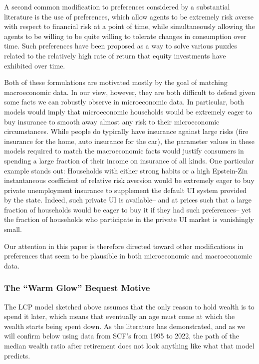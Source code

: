 \documentclass{article}
\begin{document}
A second common modification to preferences considered by a substantial literature is the use of \cite{Epstein_1991} preferences, which allow agents to be extremely risk averse with respect to financial risk at a point of time, while simultaneously allowing the agents to be willing to be quite willing to tolerate changes in consumption over time.
Such preferences have been proposed as a way to solve various puzzles related to the relatively high rate of return that equity investments have exhibited over time.

Both of these formulations are motivated mostly by the goal of matching macroeconomic data.
In our view, however, they are both difficult to defend given some facts we can robustly observe in microeconomic data.
In particular, both models would imply that microeconomic households would be extremely eager to buy insurance to smooth away almost any risk to their microeconomic circumstances.
While people do typically have insurance against large risks (fire insurance for the home, auto insurance for the car), the parameter values in these models required to match the macroeconomic facts would justify consumers in spending a large fraction of their income on insurance of all kinds.
One particular example stands out: Households with either strong habits or a high Epstein-Zin instantaneous coefficient of relative risk aversion would be extremely eager to buy private unemployment insurance to supplement the default UI system provided by the state.
Indeed, such private UI is available-- and at prices such that a large fraction of households would be eager to buy it if they had such preferences-- yet the fraction of households who participate in the private UI market is vanishingly small.

Our attention in this paper is therefore directed toward other modifications in preferences that seem to be plausible in both microeconomic and macroeconomic data.

\subsubsection{The ``Warm Glow'' Bequest Motive}

The LCP model sketched above assumes that the only reason to hold wealth is to spend it later, which means that eventually an age must come at which the wealth starts being spent down.
As the literature has demonstrated, and as we will confirm below using data from SCF's from 1995 to 2022, the path of the median wealth ratio after retirement does not look anything like what that model predicts.
\end{document}
